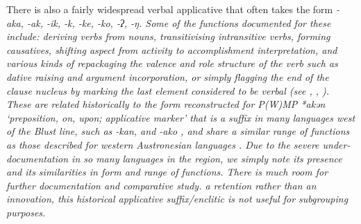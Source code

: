 There is also a fairly widespread verbal applicative that often
takes the form \it{-aka,
-ak, -ik, -k, -ke, -ko, -ʔ, -ŋ}.
Some of the functions documented for these include: deriving
verbs from nouns, transitivising intransitive verbs, forming causatives,
shifting aspect from activity to accomplishment interpretation,
and various kinds of repackaging the valence
and role structure of the verb such as dative raising
and argument incorporation, or simply flagging the end of the
clause nucleus by marking the last element considered to be verbal
(see \citealp{Jonker1906,Grimes1991b}, \citealp[108-112]{Grimes1991c}, \citealp{Tamelan2021}).
These are related historically to the form reconstructed for
P(W)MP *akən ‘preposition, on, upon; applicative marker’ that is a suffix in many languages
west of the Blust line,
such as  \it{-kan},
and  \it{-ako} \citep{Donohue1999a},
and share a similar range of functions as those described for
western Austronesian languages \citep{TruongMcDonnell2021}.
Due to the severe under-documentation in so many languages in
the region, we simply note its presence
and its similarities in form
and range of functions.
There is much room for further documentation and comparative study.
 a retention rather than an innovation,
this historical applicative suffix/enclitic is not useful for subgrouping purposes.

